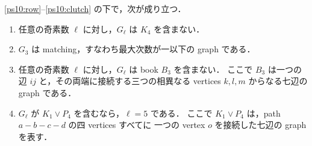 \begin{theorem}\label{ps10:forbidden}
\eqref{ps10:row}--\eqref{ps10:clutch} の下で，次が成り立つ．
\begin{enumerate}
\item 任意の奇素数 $\ell$ に対し，$G_\ell$ は $K_4$ を含まない．
\item $G_3$ は matching，すなわち最大次数が一以下の graph である．
\item 任意の奇素数 $\ell$ に対し，$G_\ell$ は book $B_3$ を含まない．
  ここで $B_3$ は一つの辺 $ij$ と，その両端に接続する三つの相異なる
  vertices $k,l,m$ からなる七辺の graph である．
\item $G_\ell$ が $K_1\vee P_4$ を含むなら，$\ell=5$ である．
  ここで $K_1\vee P_4$ は，path $a-b-c-d$ の四 vertices すべてに
  一つの vertex $o$ を接続した七辺の graph を表す．
\end{enumerate}
\end{theorem}

